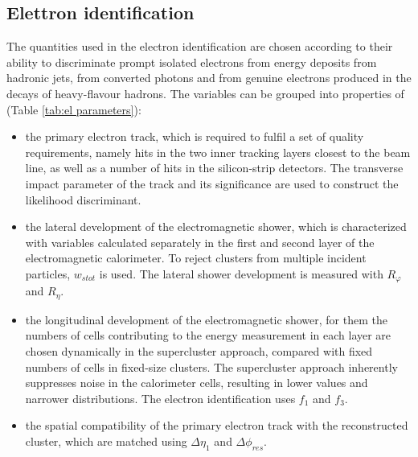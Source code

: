 \documentclass[a4paper, oneside]{book}
\begin{document}
			\subsection{Elettron identification}
			\cite{El ph reco}The quantities used in the electron identification are chosen according to their ability to discriminate prompt isolated electrons from energy deposits from hadronic jets, from converted photons and from genuine electrons produced in the decays of heavy-flavour hadrons. The variables can be
			grouped into properties of (Table \ref{tab:el parameters}):
			\begin{itemize}
				\item the primary electron track, which is required to fulfil a set of quality requirements, namely hits in the two inner tracking layers closest to the beam line, as well as a number of hits in the silicon-strip detectors. The transverse impact parameter of the track and its significance are used to construct
				the likelihood discriminant.
				\item the lateral development of the electromagnetic shower, which is characterized with variables calculated separately in the first and second layer of the electromagnetic calorimeter. To reject clusters from multiple incident particles, $w_{s tot}$ is used. The lateral shower development is measured with $R_{\varphi}$ and $R_{\eta}$.
				\item the longitudinal development of the electromagnetic shower, for them the numbers of cells contributing to the energy
				measurement in each layer are chosen dynamically in the supercluster approach, compared with fixed numbers of cells in fixed-size clusters. The supercluster approach inherently suppresses noise in the calorimeter cells, resulting in lower values and narrower distributions. The electron
				identification uses $f_1$ and $f_3$.
				\item the spatial compatibility of the primary electron track with the reconstructed cluster, which are matched using $\Delta\eta_1$ and $\Delta\phi_{res}$. 
			\end{itemize}
\end{document}

